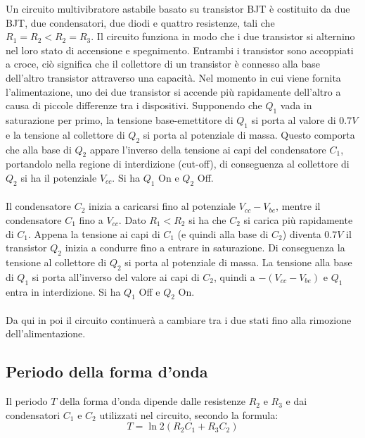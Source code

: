 Un circuito multivibratore astabile basato su transistor BJT è costituito da due BJT, due condensatori, due diodi e quattro resistenze, tali che $R_1=R_2<R_2=R_3$. Il circuito funziona in modo che i due transistor si alternino nel loro stato di accensione e spegnimento. Entrambi i transistor sono accoppiati a croce, ciò significa che il collettore di un transistor è connesso alla base dell'altro transistor attraverso una capacità.
Nel momento in cui viene fornita l'alimentazione, uno dei due transistor si accende più rapidamente dell'altro a causa di piccole differenze tra i dispositivi. Supponendo che $Q_1$ vada in saturazione per primo, la tensione base-emettitore di $Q_1$ si porta al valore di $0.7V$ e la tensione al collettore di $Q_2$ si porta al potenziale di massa. Questo comporta che alla base di $Q_2$ appare l'inverso della tensione ai capi del condensatore $C_1$, portandolo nella regione di interdizione (cut-off), di conseguenza al collettore di $Q_2$ si ha il potenziale $V_{cc}$. 
Si ha $Q_1$ On e $Q_2$ Off.\\\\
Il condensatore $C_2$ inizia a caricarsi fino al potenziale $V_{cc}-V_{be}$, mentre il condensatore $C_1$ fino a $V_{cc}$. Dato $R_1<R_2$ si ha che $C_2$ si carica più rapidamente di $C_1$.
Appena la tensione ai capi di $C_1$ (e quindi alla base di $C_2$) diventa $0.7V$ il transistor $Q_2$ inizia a condurre fino a entrare in saturazione. Di conseguenza la tensione al collettore di $Q_2$ si porta al potenziale di massa. La tensione alla base di $Q_1$ si porta all'inverso del valore ai capi di $C_2$, quindi a $-(V_{cc} - V_{be})$ e $Q_1$ entra in interdizione.
Si ha $Q_1$ Off e $Q_2$ On.\\\\
Da qui in poi il circuito continuerà a cambiare tra i due stati fino alla rimozione dell'alimentazione.
\subsection{Periodo della forma d’onda}
Il periodo $T$ della forma d'onda dipende dalle resistenze $R_2$ e $R_3$ e dai condensatori $C_1$ e $C_2$ utilizzati nel circuito, secondo la formula:
\begin{equation}
    T=\ln{2}(R_2C_1+R_3C_2)
\end{equation}
